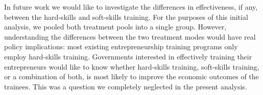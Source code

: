 In future work we would like to investigate the differences in effectiveness, if any, between the hard-skills and soft-skills training. For the purposes of this initial analysis, we pooled both treatment pools into a single group. However, understanding the differences between the two treatment modes would have real policy implications: most existing entrepreneurship training programs only employ hard-skills training. Governments interested in effectively training their entrepreneurs would like to know whether hard-skills training, soft-skills training, or a combination of both, is most likely to improve the economic outcomes of the trainees. This was a question we completely neglected in the present analysis.\\


